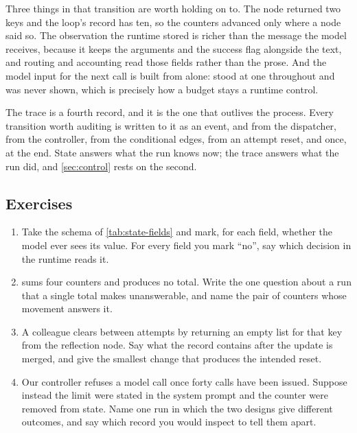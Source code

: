 Three things in that transition are worth holding on to. The node returned two keys and the
loop's record has ten, so the counters advanced only where a node said so. The observation the runtime
stored is richer than the message the model receives, because it keeps the arguments and the
success flag alongside the text, and routing and accounting read those fields rather than the
prose. And the model input for the next call is built from  alone:
 stood at one throughout and was never shown, which is precisely how a
budget stays a runtime control.

The trace is a fourth record, and it is the one that outlives the process. Every transition worth
auditing is written to it as an event,  and  from the
dispatcher,  from the controller,  from the conditional
edges,  from an attempt reset, and  once, at the end.
State answers what the run knows now; the trace answers what the run did, and
\cref{sec:control} rests on the second.

\subsection{Exercises}

\begin{enumerate}
\item Take the schema of \cref{tab:state-fields} and mark, for each field, whether the model ever
  sees its value. For every field you mark ``no'', say which decision in the runtime reads it.
\item {} sums four counters and produces no total. Write the one question about a
  run that a single total makes unanswerable, and name the pair of counters whose movement answers
  it.
\item A colleague clears  between attempts by returning an empty list for
  that key from the reflection node. Say what the record contains after the update is merged, and
  give the smallest change that produces the intended reset.
\item Our controller refuses a model call once forty calls have been issued. Suppose instead the
  limit were stated in the system prompt and the counter were removed from state. Name one run in
  which the two designs give different outcomes, and say which record you would inspect to tell
  them apart.
\end{enumerate}

